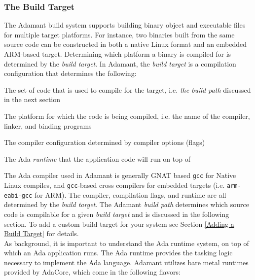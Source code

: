 \subsubsection{The Build Target} \label{The Build Target}

The Adamant build system supports building binary object and executable files for multiple target platforms. For instance, two binaries built from the same source code can be constructed in both a native Linux format and an embedded ARM-based target. Determining which platform a binary is compiled for is determined by the \textit{build target}. In Adamant, the \textit{build target} is a compilation configuration that determines the following:

\vspace{5mm} %
\begin{spacedenumerate}
  \item The set of code that is used to compile for the target, i.e. \textit{the build path} discussed in the next section
  \item The platform for which the code is being compiled, i.e. the name of the compiler, linker, and binding programs
  \item The compiler configuration determined by compiler options (flags)
  \item The Ada \textit{runtime} that the application code will run on top of
\end{spacedenumerate}
\vspace{5mm} %

The Ada compiler used in Adamant is generally GNAT based \texttt{gcc} for Native Linux compiles, and \texttt{gcc}-based cross compilers for embedded targets (i.e. \texttt{arm-eabi-gcc} for ARM). The compiler, compilation flags, and runtime are all determined by the \textit{build target}. The Adamant \textit{build path} determines which source code is compilable for a given \textit{build target} and is discussed in the following section. To add a custom build target for your system see Section \ref{Adding a Build Target} for details. \\

As background, it is important to understand the Ada runtime system, on top of which an Ada application runs. The Ada runtime provides the tasking logic necessary to implement the Ada language. Adamant utilizes bare metal runtimes provided by AdaCore, which come in the following flavors:

